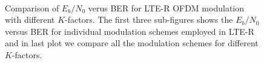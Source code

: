 \begin{figure}[t!]
  \begin{center}
   \\
     \caption{Comparison of $E_b/N_0$ verus BER for LTE-R OFDM modulation with different $K$-factors. The first three sub-figures shows the $E_b/N_0$ versus BER for individual modulation schemes employed in LTE-R and in last plot we compare all the modulation schemes for different $K$-factors.} 
\label{fig:modulation}      
   \end{center}
\end{figure}

